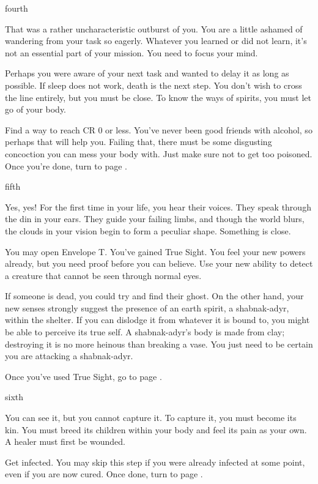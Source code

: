 \documentclass[greennotebook]{Pestilence} %
\begin{document}
\begin{page}{fourth}

That was a rather uncharacteristic outburst of you. You are a little ashamed of wandering from your task so eagerly. Whatever you learned or did not learn, it's not an essential part of your mission. You need to focus your mind. 

Perhaps you were aware of your next task and wanted to delay it as long as possible. If sleep does not work, death is the next step. You don't wish to cross the line entirely, but you must be close. To know the ways of spirits, you must let go of your body.

Find a way to reach CR 0 or less. You've never been good friends with alcohol, so perhaps that will help you. Failing that, there must be some disgusting concoction you can mess your body with. Just make sure not to get too poisoned. Once you're done, turn to page .

\end{page}

\begin{page}{fifth}

Yes, yes! For the first time in your life, you hear their voices. They speak through the din in your ears. They guide your failing limbs, and though the world blurs, the clouds in your vision begin to form a peculiar shape. Something is close.

You may open Envelope T. You've gained True Sight. You feel your new powers already, but you need proof before you can believe. Use your new ability to detect a creature that cannot be seen through normal eyes. 

If someone is dead, you could try and find their ghost. On the other hand, your new senses strongly suggest the presence of an earth spirit, a shabnak-adyr, within the shelter. If you can dislodge it from whatever it is bound to, you might be able to perceive its true self. A shabnak-adyr's body is made from clay; destroying it is no more heinous than breaking a vase. You just need to be certain you are attacking a shabnak-adyr.

Once you've used True Sight, go to page .

\end{page}

\begin{page}{sixth}

You can see it, but you cannot capture it. To capture it, you must become its kin. You must breed its children within your body and feel its pain as your own. A healer must first be wounded.

Get infected. You may skip this step if you were already infected at some point, even if you are now cured. Once done, turn to page .

\end{page}
\end{document}
